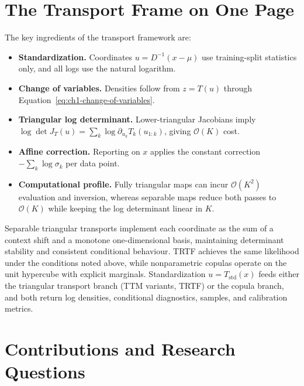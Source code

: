 \documentclass[11pt,a4paper,twoside]{book}\usepackage[]{graphicx}\usepackage[]{xcolor}
\begin{document}
\section{The Transport Frame on One Page}\label{sec:ch1-frame}

The key ingredients of the transport framework are:
\begin{itemize}
  \item \textbf{Standardization.} Coordinates $u = D^{-1}(x-\mu)$ use training-split statistics only, and all logs use the natural logarithm.
  \item \textbf{Change of variables.} Densities follow from $z = T(u)$ through Equation~\eqref{eq:ch1-change-of-variables}.
  \item \textbf{Triangular log determinant.} Lower-triangular Jacobians imply $\log \det J_T(u) = \sum_k \log \partial_{u_k} T_k(u_{1:k})$, giving $\mathcal{O}(K)$ cost.
  \item \textbf{Affine correction.} Reporting on $x$ applies the constant correction $-\sum_k \log \sigma_k$ per data point.
  \item \textbf{Computational profile.} Fully triangular maps can incur $\mathcal{O}(K^2)$ evaluation and inversion, whereas separable maps reduce both passes to $\mathcal{O}(K)$ while keeping the log determinant linear in $K$.
\end{itemize}

Separable triangular transports implement each coordinate as the sum of a context shift and a monotone one-dimensional basis, maintaining determinant stability and consistent conditional behaviour. TRTF achieves the same likelihood under the conditions noted above, while nonparametric copulas operate on the unit hypercube with explicit marginals. Standardization $u = T_{\mathrm{std}}(x)$ feeds either the triangular transport branch (TTM variants, TRTF) or the copula branch, and both return log densities, conditional diagnostics, samples, and calibration metrics.

\section{Contributions and Research Questions}\label{sec:ch1-contributions}
\end{document}
